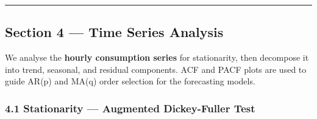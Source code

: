\documentclass[11pt]{article}
\begin{document}
    \begin{center}\rule{0.5\linewidth}{0.5pt}\end{center}

\subsection{Section 4 --- Time Series
Analysis}\label{section-4-time-series-analysis}

We analyse the \textbf{hourly consumption series} for stationarity, then
decompose it into trend, seasonal, and residual components. ACF and PACF
plots are used to guide AR(p) and MA(q) order selection for the
forecasting models.

    \subsubsection{4.1 Stationarity --- Augmented Dickey-Fuller
Test}\label{stationarity-augmented-dickey-fuller-test}
\end{document}
